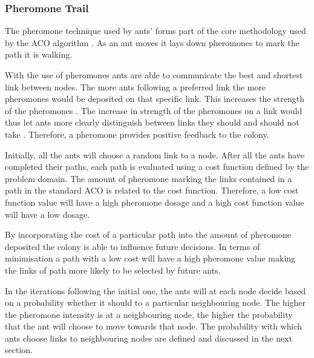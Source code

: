 \subsubsection{Pheromone Trail}
\label{sec:pheromonetrail}
The pheromone technique used by ants' forms part of the core methodology used by the \gls{ACO} algorithm \cite{AntQAP}. As an ant moves it lays down pheromones to mark the path it is walking.

With the use of pheromones ants are able to communicate the best and shortest link between nodes\cite{AntQAP,AntsAndStigmergy,CompuIntelligenceIntro}. The more ants following a preferred link the more pheromones would be deposited on that specific link. This increases the strength of the pheromones \cite{ImpACOComplex}. The increase in strength of the pheromones on a link would thus let ants more clearly distinguish between links they should and should not take \cite{ImpACOComplex}. Therefore, a pheromone provides positive feedback to the colony\cite{AntQAP,AntsAndStigmergy,CompuIntelligenceIntro}.

Initially, all the ants will choose a random link to a node\cite{AntQAP,AntsAndStigmergy,CompuIntelligenceIntro}. After all the ants have completed their paths, each path is evaluated using a cost function defined by the problem domain\cite{CompuIntelligenceIntro}. The amount of pheromone marking the links contained in a path in the standard \gls{ACO} is related to the cost function\cite{AntQAP,AntsAndStigmergy,CompuIntelligenceIntro}. Therefore, a low cost function value will have a high pheromone dosage and a high cost function value will have a low dosage\cite{CompuIntelligenceIntro}. 

By incorporating the cost of a particular path into the amount of pheromone deposited the colony is able to influence future decisions\cite{CompuIntelligenceIntro}. In terms of minimisation a path with a low cost will have a high pheromone value making the links of path more likely to be selected by future ants\cite{CompuIntelligenceIntro}.

In the iterations following the initial one, the ants will at each node decide based on a probability whether it should to a particular neighbouring node. The higher the pheromone intensity is at a neighbouring node, the higher the probability that the ant will choose to move towards that node\cite{AntQAP,AntsAndStigmergy,CompuIntelligenceIntro}. The probability with which ants choose links to neighbouring nodes are defined and discussed in the next section.

